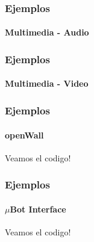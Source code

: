 \begin{frame}[t,fragile]
\frametitle{Ejemplos}
\framesubtitle{Multimedia - Audio}
\tiny
\lstset{language=Python}

\end{frame}

\begin{frame}[t,fragile]
\frametitle{Ejemplos}
\framesubtitle{Multimedia - Video}
\tiny
\lstset{language=Python}

\end{frame}

\begin{frame}[t,fragile]
\frametitle{Ejemplos}
\framesubtitle{openWall}
\begin{center}
	Veamos el codigo!
\end{center}
\end{frame}

\begin{frame}[t,fragile]
\frametitle{Ejemplos}
\framesubtitle{$\mu$Bot Interface}
\begin{center}
	Veamos el codigo!
\end{center}
\end{frame}
